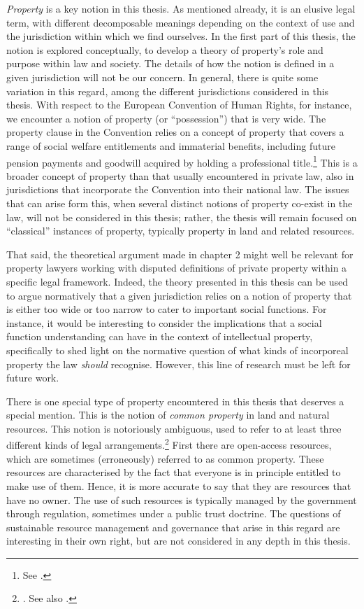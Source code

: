 {\it Property} is a key notion in this thesis. As mentioned already, it is an elusive legal term, with different decomposable meanings depending on the context of use and the jurisdiction within which we find ourselves. In the first part of this thesis, the notion is explored conceptually, to develop a theory of property's role and purpose within law and society. The details of how the notion is defined in a given jurisdiction will not be our concern. In general, there is quite some variation in this regard, among the different jurisdictions considered in this thesis. With respect to the European Convention of Human Rights, for instance, we encounter a notion of property (or ``possession'') that is very wide. The property clause in the Convention relies on a concept of property that covers a range of social welfare entitlements and immaterial benefits, including future pension payments and goodwill acquired by holding a professional title.\footnote{See \cite[73-77]{allen05}.} This is a broader concept of property than that usually encountered in private law, also in jurisdictions that incorporate the Convention into their national law. The issues that can arise form this, when several distinct notions of property co-exist in the law, will not be considered in this thesis; rather, the thesis will remain focused on ``classical'' instances of property, typically property in land and related resources.

That said, the theoretical argument made in chapter 2 might well be relevant for property lawyers working with disputed definitions of private property within a specific legal framework. Indeed, the theory presented in this thesis can be used to argue normatively that a given jurisdiction relies on a notion of property that is either too wide or too narrow to cater to important social functions. For instance, it would be interesting to consider the implications that a social function understanding can have in the context of intellectual property, specifically to shed light on the normative question of what kinds of incorporeal property the law {\it should} recognise. However, this line of research must be left for future work.

There is one special type of property encountered in this thesis that deserves a special mention. This is the notion of {\it common property} in land and natural resources. This notion is notoriously ambiguous, used to refer to at least three different kinds of legal arrangements.\footnote{\cite[714-715]{bishop75}. See also \cite[12-13]{fennel11}.} First there are open-access resources, which are sometimes (erroneously) referred to as common property. These resources are characterised by the fact that everyone is in principle entitled to make use of them. Hence, it is more accurate to say that they are resources that have no owner. The use of such resources is typically managed by the government through regulation, sometimes under a public trust doctrine. The questions of sustainable resource management and governance that arise in this regard are interesting in their own right, but are not considered in any depth in this thesis.

